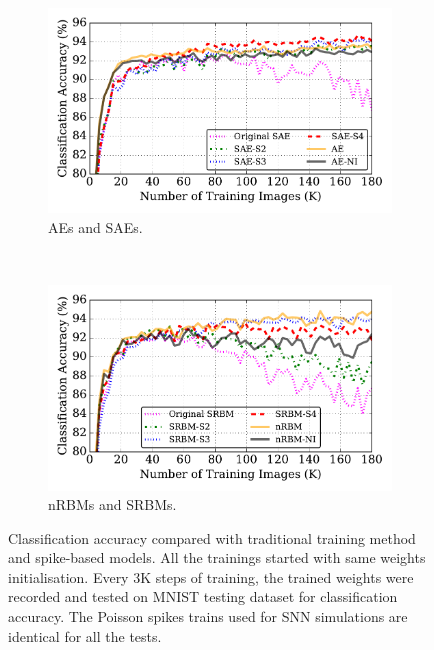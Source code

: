 \begin{figure}
	\centering
	\begin{subfigure}[t]{0.8\textwidth}
		\includegraphics[width=\textwidth]{pics_sdlm/43_MNIST_SAE_all/compare_result.pdf}
		\caption{AEs and SAEs.}
	\end{subfigure}\\
	\begin{subfigure}[t]{0.8\textwidth}
		\includegraphics[width=\textwidth]{pics_sdlm/53_MNIST_SRBM_all/compare_result.pdf}
		\caption{nRBMs and SRBMs.}
	\end{subfigure}
	\caption{Classification accuracy compared with traditional training method and spike-based models. All the trainings started with same weights initialisation. Every 3K steps of training, the trained weights were recorded and tested on MNIST testing dataset for classification accuracy. The Poisson spikes trains used for SNN simulations are identical for all the tests.}
	\label{fig:sdlm_ca}
\end{figure}
